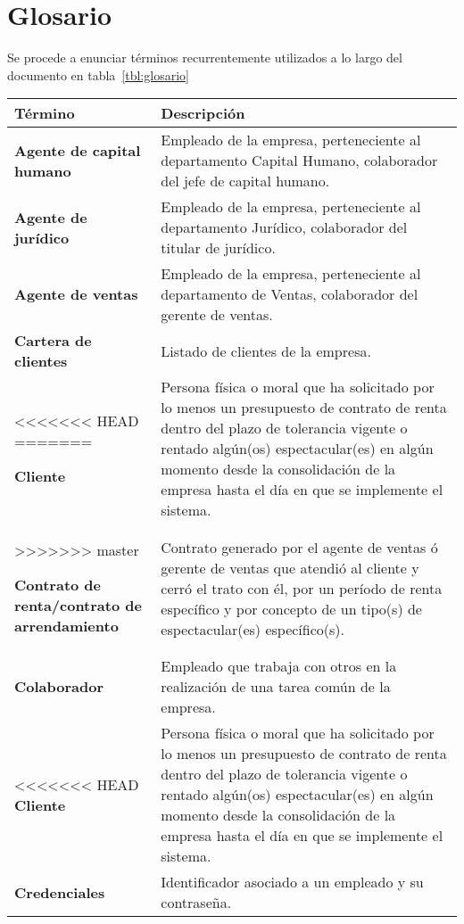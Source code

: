 \chapter{Glosario}	
Se procede a enunciar términos recurrentemente utilizados a lo largo del documento en tabla~\ref{tbl:glosario}
\begin{longtable}[H]{m{4cm}m{8cm}}
\toprule
\centering \textbf{Término} & \centering  \textbf{Descripción} \tabularnewline
\midrule

\textbf{Agente de capital humano} & Empleado de la empresa, perteneciente al departamento Capital Humano, colaborador del jefe de capital humano. \tabularnewline

\textbf{Agente de jurídico} & Empleado de la empresa, perteneciente al departamento Jurídico, colaborador del titular de jurídico. \tabularnewline

\textbf{Agente de ventas} & Empleado de la empresa, perteneciente al departamento de Ventas, colaborador del gerente de ventas. \tabularnewline

\textbf{Cartera de clientes} & Listado de clientes de la empresa. \tabularnewline
<<<<<<< HEAD
\bottomrule
=======

\textbf{Cliente} & Persona física o moral que ha solicitado por lo menos un presupuesto de contrato de renta dentro del plazo de tolerancia vigente o rentado algún(os) espectacular(es) en algún momento desde la consolidación de la empresa hasta el día en que se implemente el sistema. \tabularnewline
>>>>>>> master

\textbf{Contrato de renta/contrato de arrendamiento} & Contrato generado por el agente de ventas ó gerente de ventas que atendió al cliente y cerró el trato con él, por un período de renta específico y por concepto de un tipo(s) de espectacular(es) específico(s). \tabularnewline

\textbf{Colaborador} & Empleado que trabaja con otros en la realización de una tarea común de la empresa. \tabularnewline

<<<<<<< HEAD
\textbf{Cliente} & Persona física o moral que ha solicitado por lo menos un presupuesto de contrato de renta dentro del plazo de tolerancia vigente o rentado algún(os) espectacular(es) en algún momento desde la consolidación de la empresa hasta el día en que se implemente el sistema. \tabularnewline

\textbf{Credenciales} & Identificador asociado a un empleado y su contraseña. \tabularnewline


\end{longtable}
